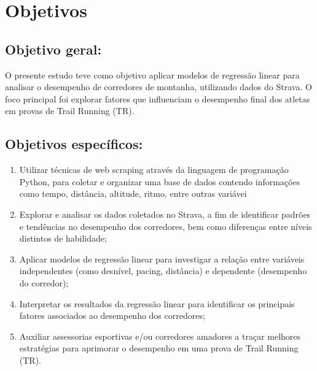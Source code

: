 \chapter{Objetivos}
\label{chap:objetivos}

\section{Objetivo geral:}

O presente estudo teve como objetivo aplicar modelos de regressão linear para analisar o desempenho de corredores de montanha, utilizando dados do Strava. O foco principal foi explorar fatores que influenciam o desempenho final dos atletas em provas de Trail Running (TR).

\section{Objetivos específicos:}

\begin{enumerate}[1.]

\item Utilizar técnicas de web scraping através da linguagem de programação Python, para coletar e organizar uma base de dados contendo informações como tempo, distância, altitude, ritmo, entre outras variávei

\item Explorar e analisar os dados coletados no Strava, a fim de identificar padrões e tendências no desempenho dos corredores, bem como diferenças entre níveis distintos de habilidade;

\item Aplicar modelos de regressão linear para investigar a relação entre variáveis independentes (como desnível, pacing, distância) e dependente (desempenho do corredor);

\item Interpretar os resultados da regressão linear para identificar os principais fatores associados ao desempenho dos corredores;

\item Auxiliar assessorias esportivas e/ou corredores amadores a traçar melhores estratégias para aprimorar o desempenho em uma prova de Trail Running (TR).

\end{enumerate}